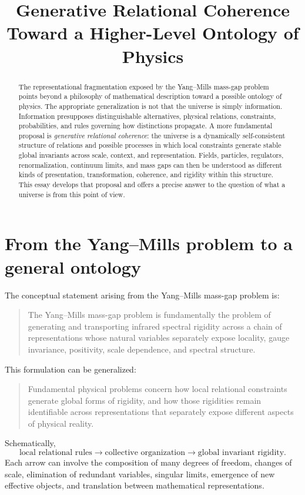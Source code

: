 \documentclass[11pt]{article}
\title{Generative Relational Coherence\\
\large Toward a Higher-Level Ontology of Physics}
\author{}
\date{}
\begin{document}
\maketitle

\begin{abstract}
The representational fragmentation exposed by the Yang--Mills mass-gap problem
points beyond a philosophy of mathematical description toward a possible
ontology of physics.  The appropriate generalization is not that the universe
is simply information.  Information presupposes distinguishable alternatives,
physical relations, constraints, probabilities, and rules governing how
distinctions propagate.  A more fundamental proposal is \emph{generative
relational coherence}: the universe is a dynamically self-consistent structure
of relations and possible processes in which local constraints generate stable
global invariants across scale, context, and representation.  Fields,
particles, regulators, renormalization, continuum limits, and mass gaps can then
be understood as different kinds of presentation, transformation, coherence,
and rigidity within this structure.  This essay develops that proposal and
offers a precise answer to the question of what a universe is from this point
of view.
\end{abstract}

\section{From the Yang--Mills problem to a general ontology}

The conceptual statement arising from the Yang--Mills mass-gap problem is:
\begin{quote}
The Yang--Mills mass-gap problem is fundamentally the problem of generating and
transporting infrared spectral rigidity across a chain of representations whose
natural variables separately expose locality, gauge invariance, positivity,
scale dependence, and spectral structure.
\end{quote}

This formulation can be generalized:
\begin{quote}
Fundamental physical problems concern how local relational constraints generate
global forms of rigidity, and how those rigidities remain identifiable across
representations that separately expose different aspects of physical reality.
\end{quote}

Schematically,
\begin{equation}
\boxed{
\text{local relational rules}
\longrightarrow
\text{collective organization}
\longrightarrow
\text{global invariant rigidity}.}
\label{eq:general-pattern}
\end{equation}
Each arrow can involve the composition of many degrees of freedom, changes of
scale, elimination of redundant variables, singular limits, emergence of new
effective objects, and translation between mathematical representations.
\end{document}
